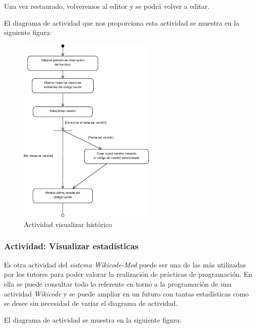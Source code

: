 Una vez restaurado, volveremos al editor y se podrá volver a editar.

El diagrama de actividad que nos proporciona esta actividad se muestra en la siguiente figura:

\begin{figure}[h]
	\centering
	\includegraphics[width=0.6\textwidth]{./img/DiagramaA8.eps}
	\caption{Actividad visualizar histórico}
\end{figure}

\newpage
\subsubsection{Actividad: Visualizar estadísticas}

Es otra actividad del \emph{sistema Wikicode-Mod} puede ser una de las más utilizadas por los tutores para poder valorar la realización de prácticas de programación. En ella se puede consultar todo lo referente en torno a la programación de una actividad \emph{Wikicode} y se puede ampliar en un futuro con tantas estadísticas como se desee sin necesidad de variar el diagrama de actividad.

El diagrama de actividad se muestra en la siguiente figura:

